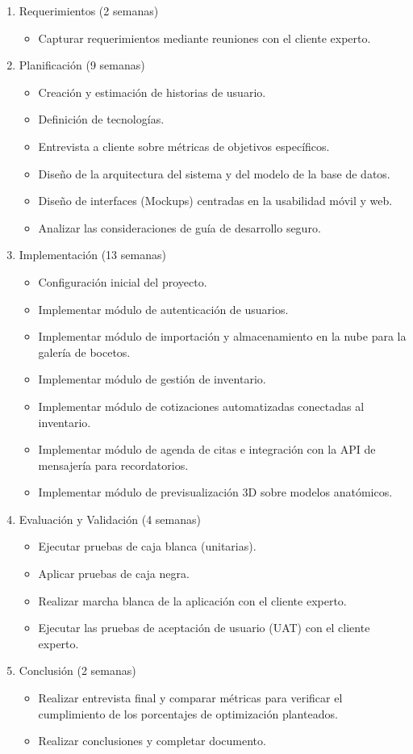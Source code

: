 \documentclass[12pt,letterpaper,oneside]{report}
\begin{document}
\begin{enumerate}
  \item Requerimientos (2 semanas)
  \begin{itemize}
    \item Capturar requerimientos mediante reuniones con el cliente experto.
  \end{itemize}
  \item Planificación (9 semanas)
  \begin{itemize}
    \item Creación y estimación de historias de usuario.
    \item Definición de tecnologías.
    \item Entrevista a cliente sobre métricas de objetivos específicos.
    \item Diseño de la arquitectura del sistema y del modelo de la base de datos.
    \item Diseño de interfaces (Mockups) centradas en la usabilidad móvil y web.
    \item Analizar las consideraciones de guía de desarrollo seguro.
  \end{itemize}
  \item Implementación (13 semanas)
  \begin{itemize}
    \item Configuración inicial del proyecto.
    \item Implementar módulo de autenticación de usuarios.
    \item Implementar módulo de importación y almacenamiento en la nube para la galería de bocetos.
    \item Implementar módulo de gestión de inventario.
    \item Implementar módulo de cotizaciones automatizadas conectadas al inventario.
    \item Implementar módulo de agenda de citas e integración con la API de mensajería para recordatorios.
    \item Implementar módulo de previsualización 3D sobre modelos anatómicos.
  \end{itemize}
  \item Evaluación y Validación (4 semanas)
  \begin{itemize}
    \item Ejecutar pruebas de caja blanca (unitarias).
    \item Aplicar pruebas de caja negra.
    \item Realizar marcha blanca de la aplicación con el cliente experto.
    \item Ejecutar las pruebas de aceptación de usuario (UAT) con el cliente experto.
  \end{itemize}
  \item Conclusión (2 semanas)
  \begin{itemize}
    \item Realizar entrevista final y comparar métricas para verificar el cumplimiento de los porcentajes de optimización planteados.
    \item Realizar conclusiones y completar documento.
  \end{itemize}
\end{enumerate}
\end{document}
